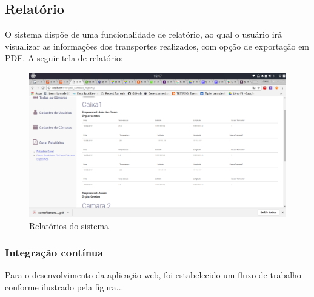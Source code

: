 \subsection{Relatório}
	O sistema dispõe de uma funcionalidade de relatório, ao qual o usuário irá visualizar as informações dos transportes realizados, com opção de exportação em PDF.
	A seguir tela de relatório:
\begin{figure}[H]
\centering
\includegraphics[width=16cm]{figuras/relatorio_software.png}
\caption{Relatórios do sistema}
\end{figure}

\subsubsection{Integração contínua}

Para o desenvolvimento da aplicação web, foi estabelecido um fluxo de trabalho conforme ilustrado pela figura...




